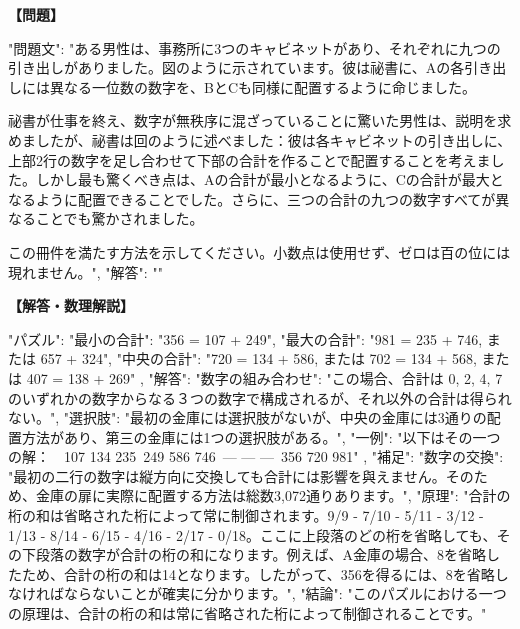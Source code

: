 \documentclass[10pt,a4paper,oneside,openany]{ltjsbook}
\begin{document}
\begin{tcolorbox}[colback=softblue,colframe=primaryblue,title=\textbf{第 79 問：THE LOCKERS PUZZLE.},arc=2mm,boxrule=1pt,breakable]
\textbf{【問題】}\par\vspace{0.3em}
{
    "問題文": "ある男性は、事務所に3つのキャビネットがあり、それぞれに九つの引き出しがありました。図のように示されています。彼は祕書に、Aの各引き出しには異なる一位数の数字を、BとCも同様に配置するように命じました。

祕書が仕事を終え、数字が無秩序に混ざっていることに驚いた男性は、説明を求めましたが、祕書は回のように述べました：彼は各キャビネットの引き出しに、上部2行の数字を足し合わせて下部の合計を作ることで配置することを考えました。しかし最も驚くべき点は、Aの合計が最小となるように、Cの合計が最大となるように配置できることでした。さらに、三つの合計の九つの数字すべてが異なることでも驚かされました。

この冊件を満たす方法を示してください。小数点は使用せず、ゼロは百の位には現れません。",
    "解答": ""
}
\tcblower
\textbf{【解答・数理解説】}\par\vspace{0.3em}
{
    "パズル": {
        "最小の合計": "356 = 107 + 249",
        "最大の合計": "981 = 235 + 746, または 657 + 324",
        "中央の合計": "720 = 134 + 586, または 702 = 134 + 568, または 407 = 138 + 269"
    },
    "解答": {
        "数字の組み合わせ": "この場合、合計は 0, 2, 4, 7 のいずれかの数字からなる３つの数字で構成されるが、それ以外の合計は得られない。",
        "選択肢": "最初の金庫には選択肢がないが、中央の金庫には3通りの配置方法があり、第三の金庫には1つの選択肢がある。",
        "一例": "以下はその一つの解：\
\
    107     134     235\
    249     586     746\
    ---     ---     ---\
    356     720     981"
    },
    "補足": {
        "数字の交換": "最初の二行の数字は縦方向に交換しても合計には影響を與えません。そのため、金庫の扉に実際に配置する方法は総数3,072通りあります。",
        "原理": "合計の桁の和は省略された桁によって常に制御されます。9/9 - 7/10 - 5/11 - 3/12 - 1/13 - 8/14 - 6/15 - 4/16 - 2/17 - 0/18。ここに上段落のどの桁を省略しても、その下段落の数字が合計の桁の和になります。例えば、A金庫の場合、8を省略したため、合計の桁の和は14となります。したがって、356を得るには、8を省略しなければならないことが確実に分かります。",
        "結論": "このパズルにおける一つの原理は、合計の桁の和は常に省略された桁によって制御されることです。"
    }
}
\end{tcolorbox}
\end{document}
